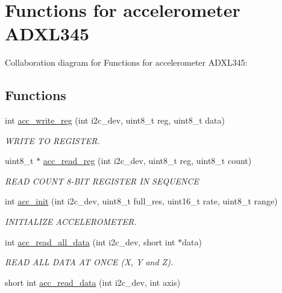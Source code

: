 \hypertarget{group__acc}{
\section{Functions for accelerometer ADXL345}
\label{group__acc}
}


Collaboration diagram for Functions for accelerometer ADXL345:

\subsection*{Functions}
\begin{DoxyCompactItemize}
\item 
int \hyperlink{group__acc_ga534116416343122de29a5b6ade6876bd}{acc\_\-write\_\-reg} (int i2c\_\-dev, uint8\_\-t reg, uint8\_\-t data)
\begin{DoxyCompactList}\small\item\em WRITE TO REGISTER. \item\end{DoxyCompactList}\item 
uint8\_\-t $\ast$ \hyperlink{group__acc_ga2a91c44eebbe44f4d3b8c508633512f9}{acc\_\-read\_\-reg} (int i2c\_\-dev, uint8\_\-t reg, uint8\_\-t count)
\begin{DoxyCompactList}\small\item\em READ COUNT 8-\/BIT REGISTER IN SEQUENCE \item\end{DoxyCompactList}\item 
int \hyperlink{group__acc_gae8f9cc6e0d15e61039d846305f86f073}{acc\_\-init} (int i2c\_\-dev, uint8\_\-t full\_\-res, uint16\_\-t rate, uint8\_\-t range)
\begin{DoxyCompactList}\small\item\em INITIALIZE ACCELEROMETER. \item\end{DoxyCompactList}\item 
int \hyperlink{group__acc_ga013bb5ed8a763883fc440549d2b1a6ce}{acc\_\-read\_\-all\_\-data} (int i2c\_\-dev, short int $\ast$data)
\begin{DoxyCompactList}\small\item\em READ ALL DATA AT ONCE (X, Y and Z). \item\end{DoxyCompactList}\item 
short int \hyperlink{group__acc_ga041d6953f2bfc8c5efa4d5bbac812305}{acc\_\-read\_\-data} (int i2c\_\-dev, int axis)

\end{DoxyCompactItemize}
